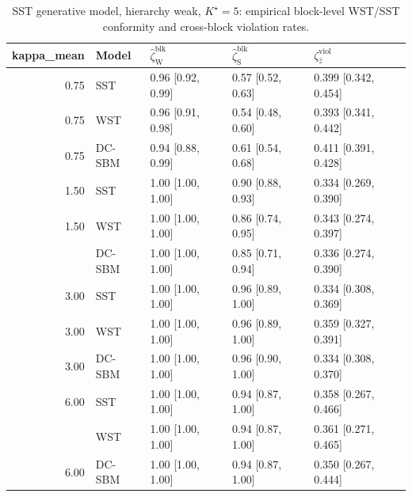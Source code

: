 \begin{table}
\centering
\caption{SST generative model, hierarchy weak, $K^\star=5$: empirical block-level WST/SST conformity and cross-block violation rates.}
\centering
\begin{tabular}[t]{rllll}
\toprule
kappa_mean & Model & $\widehat\zeta_{\mathrm{W}}^{\mathrm{blk}}$ & $\widehat\zeta_{\mathrm{S}}^{\mathrm{blk}}$ & $\zeta^{\mathrm{viol}}_{\hat z}$\\
\midrule
0.75 & SST & 0.96 [0.92, 0.99] & 0.57 [0.52, 0.63] & 0.399 [0.342, 0.454]\\
0.75 & WST & 0.96 [0.91, 0.98] & 0.54 [0.48, 0.60] & 0.393 [0.341, 0.442]\\
0.75 & DC-SBM & 0.94 [0.88, 0.99] & 0.61 [0.54, 0.68] & 0.411 [0.391, 0.428]\\
1.50 & SST & 1.00 [1.00, 1.00] & 0.90 [0.88, 0.93] & 0.334 [0.269, 0.390]\\
1.50 & WST & 1.00 [1.00, 1.00] & 0.86 [0.74, 0.95] & 0.343 [0.274, 0.397]\\
\addlinespace
1.50 & DC-SBM & 1.00 [1.00, 1.00] & 0.85 [0.71, 0.94] & 0.336 [0.274, 0.390]\\
3.00 & SST & 1.00 [1.00, 1.00] & 0.96 [0.89, 1.00] & 0.334 [0.308, 0.369]\\
3.00 & WST & 1.00 [1.00, 1.00] & 0.96 [0.89, 1.00] & 0.359 [0.327, 0.391]\\
3.00 & DC-SBM & 1.00 [1.00, 1.00] & 0.96 [0.90, 1.00] & 0.334 [0.308, 0.370]\\
6.00 & SST & 1.00 [1.00, 1.00] & 0.94 [0.87, 1.00] & 0.358 [0.267, 0.466]\\
\addlinespace
6.00 & WST & 1.00 [1.00, 1.00] & 0.94 [0.87, 1.00] & 0.361 [0.271, 0.465]\\
6.00 & DC-SBM & 1.00 [1.00, 1.00] & 0.94 [0.87, 1.00] & 0.350 [0.267, 0.444]\\
\bottomrule
\end{tabular}
\end{table}
